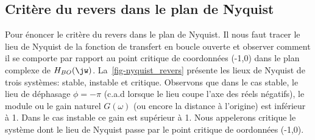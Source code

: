 \subsection{Critère du revers dans le plan de Nyquist}

Pour énoncer le critère du revers dans le plan de Nyquist. Il nous faut tracer
le lieu de Nyquist de la fonction de transfert en boucle ouverte et observer comment il 
se comporte par rapport au point critique de coordonnées (-1,0) dans le plan complexe de $H_{BO}(\jw)$.
La~\cref{fig-nyquist_revers} présente les lieux de Nyquist de trois systèmes: stable, instable et critique.
Observons que dans le cas stable, le lieu de déphasage $\phi=-\pi$ (c.a.d lorsque le lieu coupe l'axe des réels négatifs), 
le module ou le gain naturel $G(\omega)$ (ou encore la distance à l'origine) est inférieur à 1. 
Dans le cas instable ce gain est supérieur à 1. Nous appelerons critique le système dont le lieu de Nyquist passe par le
point critique de oordonnées (-1,0).

